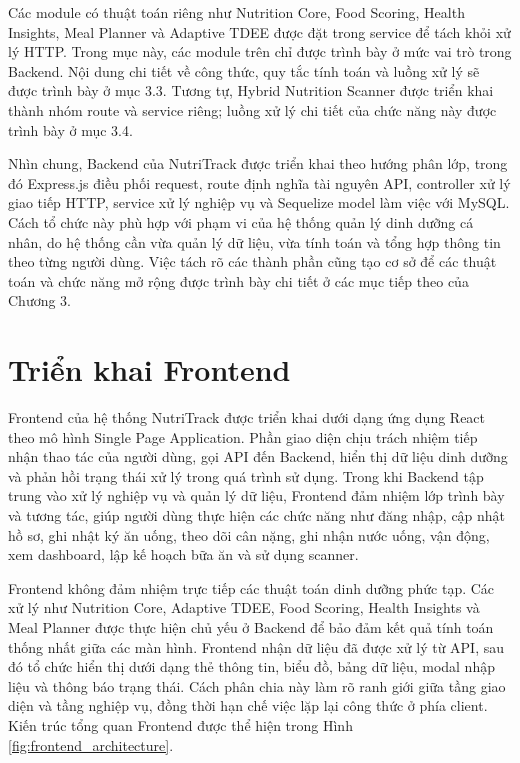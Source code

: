 \documentclass[12pt, a4paper]{report}
\begin{document}
Các module có thuật toán riêng như Nutrition Core, Food Scoring, Health Insights, Meal Planner và Adaptive TDEE được đặt trong service để tách khỏi xử lý HTTP. Trong mục này, các module trên chỉ được trình bày ở mức vai trò trong Backend. Nội dung chi tiết về công thức, quy tắc tính toán và luồng xử lý sẽ được trình bày ở mục 3.3. Tương tự, Hybrid Nutrition Scanner được triển khai thành nhóm route và service riêng; luồng xử lý chi tiết của chức năng này được trình bày ở mục 3.4.

Nhìn chung, Backend của NutriTrack được triển khai theo hướng phân lớp, trong đó Express.js điều phối request, route định nghĩa tài nguyên API, controller xử lý giao tiếp HTTP, service xử lý nghiệp vụ và Sequelize model làm việc với MySQL. Cách tổ chức này phù hợp với phạm vi của hệ thống quản lý dinh dưỡng cá nhân, do hệ thống cần vừa quản lý dữ liệu, vừa tính toán và tổng hợp thông tin theo từng người dùng. Việc tách rõ các thành phần cũng tạo cơ sở để các thuật toán và chức năng mở rộng được trình bày chi tiết ở các mục tiếp theo của Chương 3.

\section{Triển khai Frontend}Frontend của hệ thống NutriTrack được triển khai dưới dạng ứng dụng React theo mô hình Single Page Application. Phần giao diện chịu trách nhiệm tiếp nhận thao tác của người dùng, gọi API đến Backend, hiển thị dữ liệu dinh dưỡng và phản hồi trạng thái xử lý trong quá trình sử dụng. Trong khi Backend tập trung vào xử lý nghiệp vụ và quản lý dữ liệu, Frontend đảm nhiệm lớp trình bày và tương tác, giúp người dùng thực hiện các chức năng như đăng nhập, cập nhật hồ sơ, ghi nhật ký ăn uống, theo dõi cân nặng, ghi nhận nước uống, vận động, xem dashboard, lập kế hoạch bữa ăn và sử dụng scanner.

Frontend không đảm nhiệm trực tiếp các thuật toán dinh dưỡng phức tạp. Các xử lý như Nutrition Core, Adaptive TDEE, Food Scoring, Health Insights và Meal Planner được thực hiện chủ yếu ở Backend để bảo đảm kết quả tính toán thống nhất giữa các màn hình. Frontend nhận dữ liệu đã được xử lý từ API, sau đó tổ chức hiển thị dưới dạng thẻ thông tin, biểu đồ, bảng dữ liệu, modal nhập liệu và thông báo trạng thái. Cách phân chia này làm rõ ranh giới giữa tầng giao diện và tầng nghiệp vụ, đồng thời hạn chế việc lặp lại công thức ở phía client. Kiến trúc tổng quan Frontend được thể hiện trong Hình \ref{fig:frontend_architecture}.
\end{document}

